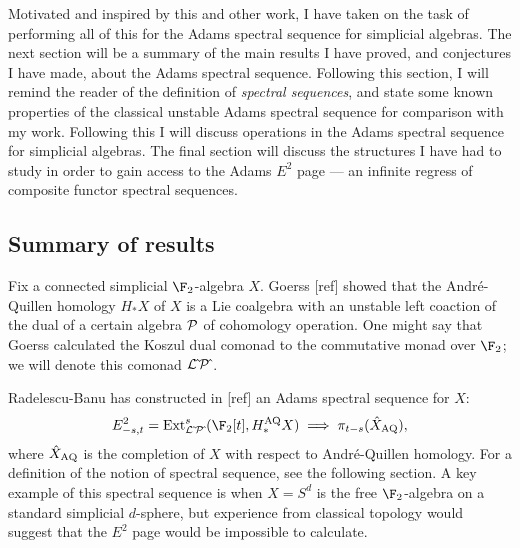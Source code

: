 \documentclass[11pt]{article}
\begin{document}
Motivated and inspired by this and other work, I have taken on the task of performing all of this for the Adams spectral sequence for simplicial algebras. The next section will be a summary of the main results I have proved, and conjectures I have made, about the Adams spectral sequence. Following this section, I will remind the reader of the definition of \emph{spectral sequences}, and state some known properties of the classical unstable Adams spectral sequence for comparison with my work. Following this I will discuss operations in the Adams spectral sequence for simplicial algebras. The final section will discuss the structures I have had to study in order to gain access to the Adams $E^2$ page --- an infinite regress of composite functor spectral sequences.
\subsection*{Summary of results}
Fix a connected simplicial $\F_2$-algebra $X$.
Goerss [ref] showed that the Andr\'e-Quillen homology $H_*X$ of $X$ is a Lie coalgebra with an unstable left coaction of the dual of a certain algebra $\mathcal{P}$ of cohomology operation. One might say that Goerss calculated the Koszul dual comonad to the commutative monad over $\F_2$; we will denote this comonad $\mathcal{L}\hat{\,}\mathcal{P}\hat{\,}$.

Radelescu-Banu has constructed in [ref] an Adams spectral sequence for $X$:
\[E^2_{-s,t}=\Ext^s_{\calL\hat{\,}\calP\hat{\,}}(\F_2[t],H_*^\textup{AQ}X)\implies \pi_{t-s}(\hat X_\textup{AQ}),\]
where $\hat X_\textup{AQ}$ is the completion of $X$ with respect to Andr\'e-Quillen homology. For a definition of the notion of spectral sequence, see the following section. A key example of this spectral sequence is when $X=S^d$ is the free $\F_2$-algebra on a standard simplicial $d$-sphere, but experience from classical topology would suggest that the $E^2$ page would be impossible to calculate. %
\end{document}
